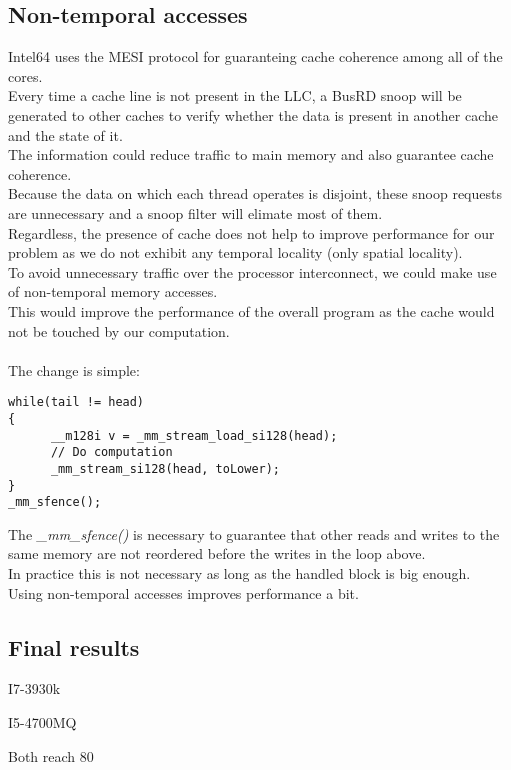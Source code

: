 \documentclass[10pt, fleqn]{article}
\begin{document}
\subsection{Non-temporal accesses}
Intel64 uses the MESI protocol for guaranteing cache coherence among all of the cores.\\
Every time a cache line is not present in the LLC, a BusRD snoop will be generated to other caches to verify whether the data is present in another cache and the state of it.\\
The information could reduce traffic to main memory and also guarantee cache coherence.\\
Because the data on which each thread operates is disjoint, these snoop requests are unnecessary and a snoop filter will elimate most of them.\\
Regardless, the presence of cache does not help to improve performance for our problem as we do not exhibit any temporal locality (only spatial locality).\\
To avoid unnecessary traffic over the processor interconnect, we could make use of non-temporal memory accesses.\\
This would improve the performance of the overall program as the cache would not be touched by our computation.\\\\
The change is simple:\\
\begin{lstlisting}
while(tail != head)
{
      __m128i v = _mm_stream_load_si128(head);
      // Do computation
      _mm_stream_si128(head, toLower);
}
_mm_sfence();
\end{lstlisting}

The \textit{\_mm\_sfence()} is necessary to guarantee that other reads and writes to the same memory are not reordered before the writes in the loop above.\\
In practice this is not necessary as long as the handled block is big enough.\\
Using non-temporal accesses improves performance a bit.

\subsection{Final results}

I7-3930k

I5-4700MQ

Both reach 80%

\iffalse
\begin{abstract}
		This is where the abstract goes
\end{abstract}
\fi

\iffalse
\begin{thebibliography}{9}
\bibitem{nano3}
  K. Grove-Rasmussen og Jesper Nygård,
  \emph{Kvantefænomener i Nanosystemer}.
  Niels Bohr Institute \& Nano-Science Center, Københavns Universitet

\end{thebibliography}
\fi
\end{document}
